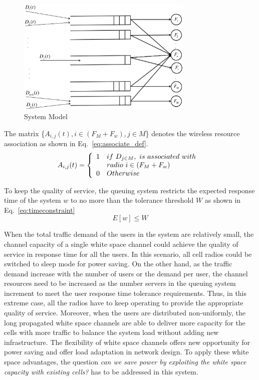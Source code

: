 

\begin{figure}
\vspace{-0.0in}
\centering
\includegraphics[width=84mm]{figures/flowconfig}
\vspace{-0.1in}
\caption{System Model}
\label{fig:flowconfig}
\vspace{-0.3in}
\end{figure}

The matrix \{$A_{i,j}(t),i\in (F_M+F_w), j\in M$\} denotes the wireless resource association
as shown in Eq.~\ref{eq:associate_def}.
\begin{equation}
\label{eq:associate_def}
 A_{i,j}(t) = \left\{ 
	  \begin{array}{l l}
	    1   &  if\ D_{j\in M},\ is\ associated\ with\ \\
		& radio\ i \in (F_M+F_w) \\
		0 &  Otherwise
			    \end{array} \right.
\end{equation}

To keep the quality of service, the queuing system restricts the expected response time of 
the system $w$ to no more than the tolerance threshold $W$ as shown in Eq.~\ref{eq:timeconstraint}
\begin{equation}
\label{eq:timeconstraint}
E[w]\le W
\end{equation}

When the total traffic demand of the users in the system are relatively small, 
the channel capacity of a single white space channel could achieve the quality of 
service in response time for all the users. 
In this scenario, all cell radios could be switched to sleep mode for power saving. 
On the other hand, as the traffic demand increase with the number of users or the demand per 
user, the channel resources need to be increased as the number servers in the queuing system increment 
to meet the user response time tolerance requirements. Thus, in this extreme case, all the radios 
have to keep operating to provide the appropriate quality of service. 
Moreover, when the users are distributed non-uniformly, the long propagated white space channels 
are able to deliver more capacity for the cells with more traffic to balance the system load 
without adding new infrastructure. 
The flexibility of white space channels offers new opportunity for power saving and 
offer load adaptation in network design.
To apply these white space advantages, the question {\it can we save power by exploiting 
the white space capacity with existing cells?} has to be addressed in this system.


